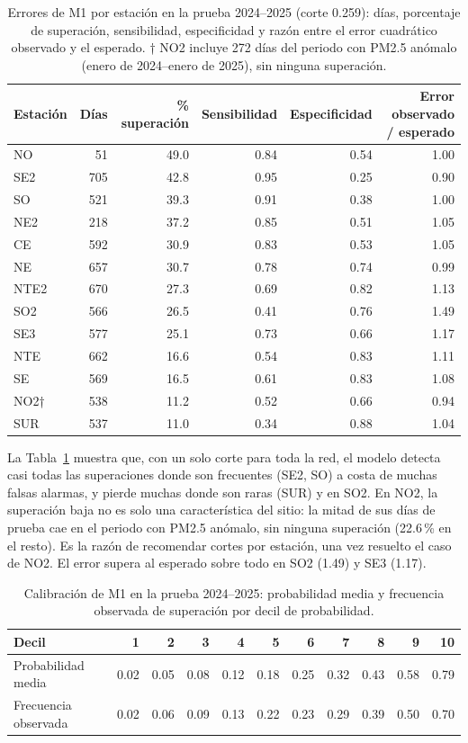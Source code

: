 \begin{table}[H]
\centering\small
\caption{Errores de M1 por estación en la prueba 2024–2025 (corte 0.259): días, porcentaje de superación, sensibilidad, especificidad y razón entre el error cuadrático observado y el esperado. † NO2 incluye 272 días del periodo con PM2.5 anómalo (enero de 2024–enero de 2025), sin ninguna superación.}
\label{tbl:c-errores}
\begin{tabular}{lrrrrr}
\toprule
Estación & Días & \% superación & Sensibilidad & Especificidad & Error observado / esperado\\
\midrule
NO & 51 & 49.0 & 0.84 & 0.54 & 1.00\\
SE2 & 705 & 42.8 & 0.95 & 0.25 & 0.90\\
SO & 521 & 39.3 & 0.91 & 0.38 & 1.00\\
NE2 & 218 & 37.2 & 0.85 & 0.51 & 1.05\\
CE & 592 & 30.9 & 0.83 & 0.53 & 1.05\\
NE & 657 & 30.7 & 0.78 & 0.74 & 0.99\\
NTE2 & 670 & 27.3 & 0.69 & 0.82 & 1.13\\
SO2 & 566 & 26.5 & 0.41 & 0.76 & 1.49\\
SE3 & 577 & 25.1 & 0.73 & 0.66 & 1.17\\
NTE & 662 & 16.6 & 0.54 & 0.83 & 1.11\\
SE & 569 & 16.5 & 0.61 & 0.83 & 1.08\\
NO2† & 538 & 11.2 & 0.52 & 0.66 & 0.94\\
SUR & 537 & 11.0 & 0.34 & 0.88 & 1.04\\
\bottomrule
\end{tabular}
\end{table}

La Tabla~\ref{tbl:c-errores} muestra que, con un solo corte para toda la red, el modelo detecta casi todas las superaciones donde son frecuentes (SE2, SO) a costa de muchas falsas alarmas, y pierde muchas donde son raras (SUR) y en SO2. En NO2, la superación baja no es solo una característica del sitio: la mitad de sus días de prueba cae en el periodo con PM2.5 anómalo, sin ninguna superación (22.6\,\% en el resto). Es la razón de recomendar cortes por estación, una vez resuelto el caso de NO2. El error supera al esperado sobre todo en SO2 (1.49) y SE3 (1.17).

\begin{table}[H]
\centering\small
\caption{Calibración de M1 en la prueba 2024–2025: probabilidad media y frecuencia observada de superación por decil de probabilidad.}
\label{tbl:c-calibracion}
\begin{tabular}{lrrrrrrrrrr}
\toprule
Decil & 1 & 2 & 3 & 4 & 5 & 6 & 7 & 8 & 9 & 10\\
\midrule
Probabilidad media & 0.02 & 0.05 & 0.08 & 0.12 & 0.18 & 0.25 & 0.32 & 0.43 & 0.58 & 0.79\\
Frecuencia observada & 0.02 & 0.06 & 0.09 & 0.13 & 0.22 & 0.23 & 0.29 & 0.39 & 0.50 & 0.70\\
\bottomrule
\end{tabular}
\end{table}

